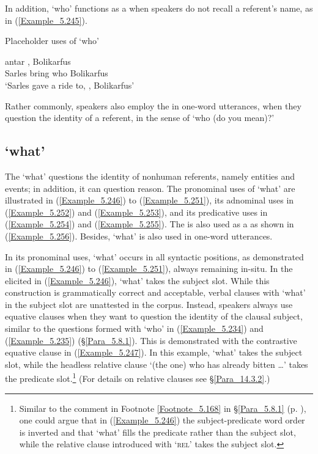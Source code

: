 In addition,  ‘who’ functions as a  when speakers do not recall a referent’s name, as in (\ref{Example_5.245}).


\begin{styleExampleTitle}
Placeholder uses of  ‘who’
\end{styleExampleTitle}

\ea
\label{Example_5.245}
 {antar} {,} {Bolikarfus}\\ %
 Sarles  bring  who  Bolikarfus\\
\glt 
‘Sarles gave a ride to, , Bolikarfus’ \textstyleExampleSource{[081002-001-CvNP.0031]}
\z


Rather commonly, speakers also employ the  in one-word utterances, when they question the identity of a referent, in the sense of ‘who (do you mean)?’


\subsection{ ‘what’}
\label{Para_5.8.2}
The   ‘what’ questions the identity of nonhuman referents, name\-ly entities and events; in addition, it can question reason. The pronominal uses of  ‘what’ are illustrated in (\ref{Example_5.246}) to (\ref{Example_5.251}), its adnominal uses in (\ref{Example_5.252}) and (\ref{Example_5.253}), and its predicative uses in (\ref{Example_5.254}) and (\ref{Example_5.255}). The  is also used as a  as shown in (\ref{Example_5.256}). Besides,  ‘what’ is also used in one-word utterances.

In its pronominal uses,  ‘what’ occurs in all syntactic positions, as demonstrated in (\ref{Example_5.246}) to (\ref{Example_5.251}), always remaining in-situ. In the elicited  in (\ref{Example_5.246}),  ‘what’ takes the subject slot. While this construction is grammatically correct and acceptable, verbal clauses with  ‘what’ in the subject slot are unattested in the corpus. Instead, speakers always use equative clauses when they want to question the identity of the clausal subject, similar to the questions formed with  ‘who’ in (\ref{Example_5.234}) and (\ref{Example_5.235}) (§\ref{Para_5.8.1}). This is demonstrated with the contrastive equative clause in (\ref{Example_5.247}). In this example,  ‘what’ takes the subject slot, while the headless relative clause  ‘(the one) who has already bitten {\ldots}’ takes the predicate slot.\footnote{Similar to the comment in Footnote \ref{Footnote_5.168} in §\ref{Para_5.8.1} (p. \pageref{Footnote_5.168}), one could argue that in (\ref{Example_5.246}) the subject-predicate word order is inverted and that  ‘what’ fills the predicate rather than the subject slot, while the relative clause introduced with  ‘\textsc{rel}’ takes the subject slot.} (For details on relative clauses see §\ref{Para_14.3.2}.)


